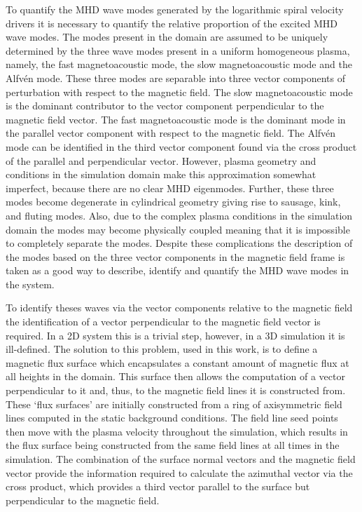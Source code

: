 To quantify the MHD wave modes generated by the logarithmic spiral velocity drivers it is necessary to quantify the relative proportion of the excited MHD wave modes.
The modes present in the domain are assumed to be uniquely determined by the three wave modes present in a uniform homogeneous plasma, namely, the fast magnetoacoustic mode, the slow magnetoacoustic mode and the Alfv\'en mode.
These three modes are separable into three vector components of perturbation with respect to the magnetic field.
The slow magnetoacoustic mode is the dominant contributor to the vector component perpendicular to the magnetic field vector.
The fast magnetoacoustic mode is the dominant mode in the parallel vector component with respect to the magnetic field.
The Alfv\'en mode can be identified in the third vector component found via the cross product of the parallel and perpendicular vector.
However, plasma geometry and conditions in the simulation domain make this approximation somewhat imperfect, because there are no clear MHD eigenmodes.
Further, these three modes become degenerate in cylindrical geometry giving rise to sausage, kink, and fluting modes.
Also, due to the complex plasma conditions in the simulation domain the modes may become physically coupled meaning that it is impossible to completely separate the modes.
Despite these complications the description of the modes based on the three vector components in the magnetic field frame is taken as a good way to describe, identify and quantify the MHD wave modes in the system.

To identify theses waves via the vector components relative to the magnetic field the identification of a vector perpendicular to the magnetic field vector is required.
In a 2D system this is a trivial step, however, in a 3D simulation it is ill-defined.
The solution to this problem, used in this work, is to define a magnetic flux surface which encapsulates a constant amount of magnetic flux at all heights in the domain.
This surface then allows the computation of a vector perpendicular to it and, thus, to the magnetic field lines it is constructed from.
These `flux surfaces' are initially constructed from a ring of axisymmetric field lines computed in the static background conditions.
The field line seed points then move with the plasma velocity throughout the simulation, which results in the flux surface being constructed from the same field lines at all times in the simulation.
The combination of the surface normal vectors and the magnetic field vector provide the information required to calculate the azimuthal vector via the cross product, which provides a third vector parallel to the surface but perpendicular to the magnetic field.

